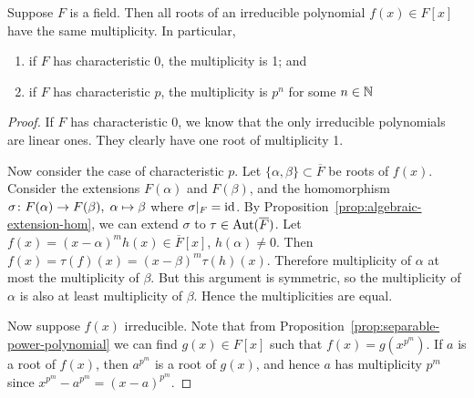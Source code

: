 \begin{proposition}\label{prop:irreducible-multiplicity}
    Suppose \(F\) is a field.
    Then all roots of an irreducible polynomial \(f(x) \in F[x]\) have the same multiplicity.
    In particular,
    \begin{enumerate}[label={(\alph*)}, itemsep=0mm]
        \item if \(F\) has characteristic 0, the multiplicity is 1; and
        \item if \(F\) has characteristic \(p\),
            the multiplicity is \(p^n\) for some \(n \in \mathbb{N}\)
    \end{enumerate}
\end{proposition}
\begin{proof}
    If \(F\) has characteristic 0,
    we know that the only irreducible polynomials are linear ones.
    They clearly have one root of multiplicity 1.

    Now consider the case of characteristic \(p\).
    Let \(\{\alpha,\beta\}\subset\overline{F}\) be roots of \(f(x)\).
    Consider the extensions \(F(\alpha)\) and \(F(\beta)\),
    and the homomorphism \(\sigma\colon F(\alpha)\to F(\beta),\;\alpha\mapsto\beta\)
    where \(\sigma\vert_F = \operatorname{id}\).
    By Proposition~\ref{prop:algebraic-extension-hom},
    we can extend \(\sigma\) to \(\tau\in\operatorname{Aut}(\overline{F})\).
    Let \(f(x) = {(x-\alpha)}^m h(x) \in \overline{F}[x]\), \(h(\alpha) \neq 0\).
    Then \(f(x) = \tau(f)(x) = {(x-\beta)}^m \tau(h)(x)\).
    Therefore multiplicity of \(\alpha\) at most the multiplicity of \(\beta\).
    But this argument is symmetric,
    so the multiplicity of \(\alpha\) is also at least multiplicity of \(\beta\).
    Hence the multiplicities are equal.

    Now suppose \(f(x)\) irreducible.
    Note that from Proposition~\ref{prop:separable-power-polynomial}
    we can find \(g(x) \in F[x]\) such that \(f(x) = g(x^{p^m})\).
    If \(a\) is a root of \(f(x)\), then \(a^{p^m}\) is a root of \(g(x)\),
    and hence \(a\) has multiplicity \(p^m\)
    since \(x^{p^m} - a^{p^m} = {(x-a)}^{p^m}\).
\end{proof}

